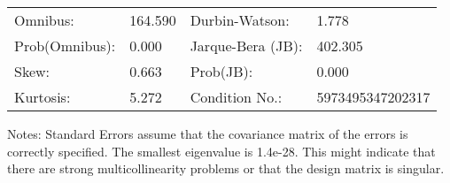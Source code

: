 \begin{table}
\begin{center}
\begin{tabular}{llll}
\hline
Omnibus:       & 164.590 & Durbin-Watson:    & 1.778             \\
Prob(Omnibus): & 0.000   & Jarque-Bera (JB): & 402.305           \\
Skew:          & 0.663   & Prob(JB):         & 0.000             \\
Kurtosis:      & 5.272   & Condition No.:    & 5973495347202317  \\
\hline
\end{tabular}
\end{center}
\end{table}
\bigskip
Notes: \newline 
[1] Standard Errors assume that the covariance matrix of the errors is correctly specified. \newline 
[2] The smallest eigenvalue is 1.4e-28. This might indicate that                there are strong multicollinearity problems or that the design                matrix is singular.